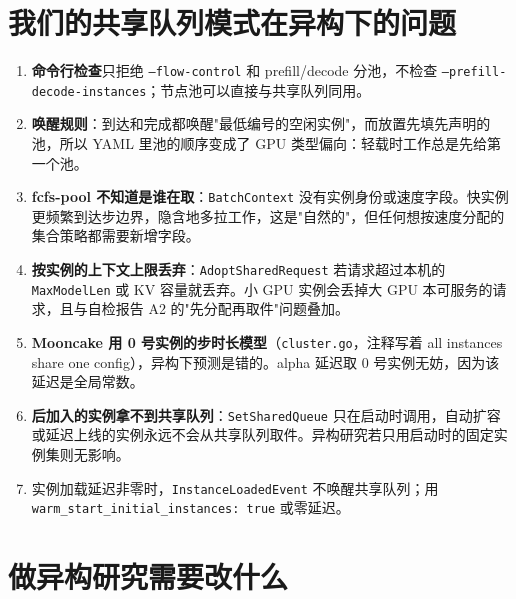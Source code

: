 \documentclass[11pt,a4paper,fontset=windows]{ctexart}
\begin{document}
\section{我们的共享队列模式在异构下的问题}

\begin{enumerate}
\item \textbf{命令行检查}只拒绝 \texttt{--flow-control} 和 prefill/decode 分池，不检查 \texttt{--prefill-decode-instances}；节点池可以直接与共享队列同用。
\item \textbf{唤醒规则}：到达和完成都唤醒"最低编号的空闲实例"，而放置先填先声明的池，所以 YAML 里池的顺序变成了 GPU 类型偏向：轻载时工作总是先给第一个池。
\item \textbf{fcfs-pool 不知道是谁在取}：\texttt{BatchContext} 没有实例身份或速度字段。快实例更频繁到达步边界，隐含地多拉工作，这是"自然的"，但任何想按速度分配的集合策略都需要新增字段。
\item \textbf{按实例的上下文上限丢弃}：\texttt{AdoptSharedRequest} 若请求超过本机的 \texttt{MaxModelLen} 或 KV 容量就丢弃。小 GPU 实例会丢掉大 GPU 本可服务的请求，且与自检报告 A2 的"先分配再取件"问题叠加。
\item \textbf{Mooncake 用 0 号实例的步时长模型}（\texttt{cluster.go}，注释写着 all instances share one config），异构下预测是错的。alpha 延迟取 0 号实例无妨，因为该延迟是全局常数。
\item \textbf{后加入的实例拿不到共享队列}：\texttt{SetSharedQueue} 只在启动时调用，自动扩容或延迟上线的实例永远不会从共享队列取件。异构研究若只用启动时的固定实例集则无影响。
\item 实例加载延迟非零时，\texttt{InstanceLoadedEvent} 不唤醒共享队列；用 \texttt{warm\_start\_initial\_instances: true} 或零延迟。
\end{enumerate}

\section{做异构研究需要改什么}
\end{document}
